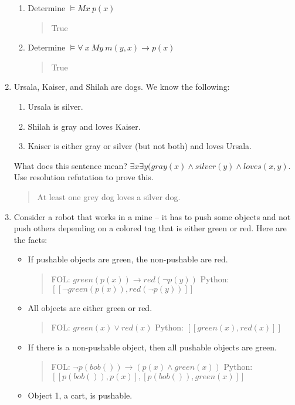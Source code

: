 \documentclass{article}
\begin{document}
\begin{enumerate}
\begin{enumerate}
\item Determine $\models M x\ p(x)$
\begin{quote}
True
\end{quote}
\item Determine $\models \forall \ x\ M y \ m(y,x) \rightarrow p(x)$
\begin{quote}
True
\end{quote}
\end{enumerate}
\item Ursala, Kaiser, and Shilah are dogs.  We know the following:
\begin{enumerate}
\item Ursala is silver.
\item Shilah is gray and loves Kaiser.
\item Kaiser is either gray or silver (but not both) and loves Ursala.
\end{enumerate}
What does this sentence mean? $\exists x \exists y (gray(x) \wedge silver(y) \wedge loves(x,y)$.  Use resolution refutation to prove this.
\begin{quote}
At least one grey dog loves a silver dog.
\end{quote}
\item Consider a robot that works in a mine -- it has to push some objects and not push others depending on a colored tag that is either green or red.  Here are the facts:
\begin{itemize}
\item If pushable objects are green, the non-pushable are red.
\begin{quote}
FOL: $green(p(x)) \rightarrow red(\neg p(y))$ \newline
Python: $[[\neg green(p(x)), red(\neg p(y))]]$
\end{quote}
\item All objects are either green or red.
\begin{quote}
FOL: $green(x) \vee red(x)$ \newline
Python: $[[green(x), red(x)]]$
\end{quote}
\item If there is a non-pushable object, then all pushable objects are green.
\begin{quote}
FOL:  $\neg p(bob()) \rightarrow (p(x) \wedge green(x))$ \newline
Python:  $[[p(bob()), p(x)], [p(bob()), green(x)]]$
\end{quote}
\item Object 1, a cart, is pushable.

\end{itemize}
\end{enumerate}
\end{document}
